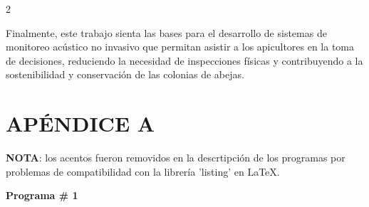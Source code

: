 \documentclass[12pt]{report}
\newenvironment{tightmulticols}{%
  \begin{multicols}{2}
  \setlength{\parskip}{1.2pt}
  \linespread{1}\selectfont
}{%
  \end{multicols}
}
\newcounter{specialchapter}
\renewcommand{\thespecialchapter}{\Alph{specialchapter}}
\newcommand{\specialchapter}[1]{%
  \chapter*{#1}%
  \setcounter{specialchapter}{\value{chapter}}%
  \renewcommand{\thechapter}{\thespecialchapter}%
}
\begin{document}
\begin{tightmulticols}
\par Finalmente, este trabajo sienta las bases para el desarrollo de sistemas de monitoreo acústico no invasivo que permitan asistir a los apicultores en la toma de decisiones, reduciendo la necesidad de inspecciones físicas y contribuyendo a la sostenibilidad y conservación de las colonias de abejas.

\end{tightmulticols}


\pagebreak
{}
\printbibliography
\thispagestyle{empty}


\pagebreak
\setcounter{chapter}{1}
\specialchapter{APÉNDICE A}

\textbf{NOTA}: los acentos fueron removidos en la descrtipción de los programas por problemas de compatibilidad con la librería 'listing' en \LaTeX.

\begin{center}
\large\textbf{Programa \# 1}
\end{center}
\end{document}
